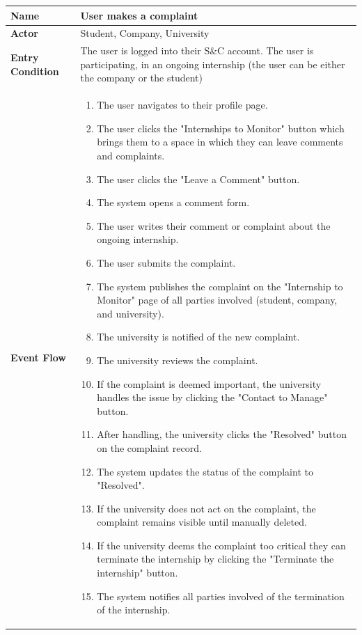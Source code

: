 \begin{longtable}{|p{}|p{}|}
\hline
\textbf{Name} &  User makes a complaint\\
\hline
\textbf{Actor} &  Student, Company, University\\
\hline
\textbf{Entry Condition} &  The user is logged into their S\&C account. The user is participating, in an ongoing internship (the user can be either the company or the student)\\
\hline
\textbf{Event Flow} &  
\begin{enumerate}
    \item The user navigates to their profile page.
    \item The user clicks the "Internships to Monitor" button which brings them to a space in which they can leave comments and complaints.
    \item The user clicks the "Leave a Comment" button.
    \item The system opens a comment form.
    \item The user writes their comment or complaint about the ongoing internship.
    \item The user submits the complaint.
    \item The system publishes the complaint on the "Internship to Monitor" page of all parties involved (student, company, and university).
    \item The university is notified of the new complaint.
    \item The university reviews the complaint.
    \item If the complaint is deemed important, the university handles the issue by clicking the "Contact to Manage" button.
    \item After handling, the university clicks the "Resolved" button on the complaint record.
    \item The system updates the status of the complaint to "Resolved".
    \item If the university does not act on the complaint, the complaint remains visible until manually deleted.
    \item If the university deems the complaint too critical they can terminate the internship by clicking the "Terminate the internship" button.
    \item The system notifies all parties involved of the termination of the internship.
\end{enumerate}
\\
\hline

\end{longtable}
